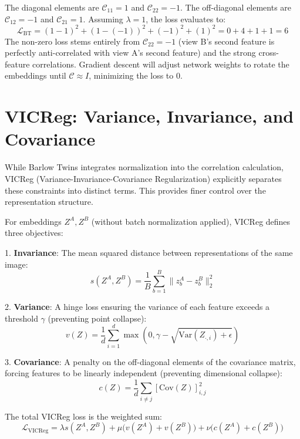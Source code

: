 The diagonal elements are $\mathcal{C}_{11} = 1$ and $\mathcal{C}_{22} = -1$. The off-diagonal elements are $\mathcal{C}_{12} = -1$ and $\mathcal{C}_{21} = 1$.
Assuming $\lambda = 1$, the loss evaluates to:
\begin{equation}
    \mathcal{L}_{\text{BT}} = (1 - 1)^2 + (1 - (-1))^2 + (-1)^2 + (1)^2 = 0 + 4 + 1 + 1 = 6
\end{equation}
The non-zero loss stems entirely from $\mathcal{C}_{22} = -1$ (view B's second feature is perfectly anti-correlated with view A's second feature) and the strong cross-feature correlations. Gradient descent will adjust network weights to rotate the embeddings until $\mathcal{C} \approx I$, minimizing the loss to 0.

\section{VICReg: Variance, Invariance, and Covariance}
While Barlow Twins integrates normalization into the correlation calculation, VICReg (Variance-Invariance-Covariance Regularization) explicitly separates these constraints into distinct terms. This provides finer control over the representation structure.

For embeddings $Z^A, Z^B$ (without batch normalization applied), VICReg defines three objectives:

1. \textbf{Invariance}: The mean squared distance between representations of the same image:
\begin{equation}
    s(Z^A, Z^B) = \frac{1}{B} \sum_{b=1}^B \|z^A_b - z^B_b\|_2^2
\end{equation}

2. \textbf{Variance}: A hinge loss ensuring the variance of each feature exceeds a threshold $\gamma$ (preventing point collapse):
\begin{equation}
    v(Z) = \frac{1}{d} \sum_{i=1}^d \max(0, \gamma - \sqrt{\text{Var}(Z_{\cdot, i}) + \epsilon})
\end{equation}

3. \textbf{Covariance}: A penalty on the off-diagonal elements of the covariance matrix, forcing features to be linearly independent (preventing dimensional collapse):
\begin{equation}
    c(Z) = \frac{1}{d} \sum_{i \neq j} [\text{Cov}(Z)]_{i,j}^2
\end{equation}

The total VICReg loss is the weighted sum:
\begin{equation}
    \mathcal{L}_{\text{VICReg}} = \lambda s(Z^A, Z^B) + \mu \big(v(Z^A) + v(Z^B)\big) + \nu \big(c(Z^A) + c(Z^B)\big)
\end{equation}

